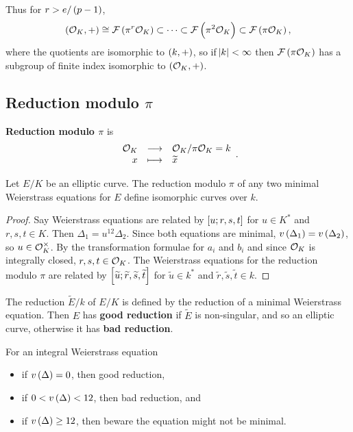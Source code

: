 Thus for $ r > e / \br{p - 1} $,
$$ \br{\OOO_K, +} \cong \FFF\br{\pi^r\OOO_K} \subset \dots \subset \FFF\br{\pi^2\OOO_K} \subset \FFF\br{\pi\OOO_K}, $$
where the quotients are isomorphic to $ \br{k, +} $, so if $ \abs{k} < \infty $ then $ \FFF\br{\pi\OOO_K} $ has a subgroup of finite index isomorphic to $ \br{\OOO_K, +} $.

\subsection{Reduction modulo \texorpdfstring{$ \pi $}{p}}

\begin{notation*}
\textbf{Reduction modulo $ \pi $} is
$$ \function{\OOO_K}{\OOO_K / \pi\OOO_K = k}{x}{\widetilde{x}}. $$
\end{notation*}

\begin{proposition}
Let $ E / K $ be an elliptic curve. The reduction modulo $ \pi $ of any two minimal Weierstrass equations for $ E $ define isomorphic curves over $ k $.
\end{proposition}

\begin{proof}
Say Weierstrass equations are related by $ \sbr{u; r, s, t} $ for $ u \in K^* $ and $ r, s, t \in K $. Then $ \Delta_1 = u^{12}\Delta_2 $. Since both equations are minimal, $ v\br{\Delta_1} = v\br{\Delta_2} $, so $ u \in \mathcal{O}_K^\times $. By the transformation formulae for $ a_i $ and $ b_i $ and since $ \mathcal{O}_K $ is integrally closed, $ r, s, t \in \mathcal{O}_K $. The Weierstrass equations for the reduction modulo $ \pi $ are related by $ \sbr{\widetilde{u}; \widetilde{r}, \widetilde{s}, \widetilde{t}} $ for $ \widetilde{u} \in k^* $ and $ \widetilde{r}, \widetilde{s}, \widetilde{t} \in k $.
\end{proof}

\begin{definition*}
The reduction $ \widetilde{E} / k $ of $ E / K $ is defined by the reduction of a minimal Weierstrass equation. Then $ E $ has \textbf{good reduction} if $ \widetilde{E} $ is non-singular, and so an elliptic curve, otherwise it has \textbf{bad reduction}.
\end{definition*}

For an integral Weierstrass equation
\begin{itemize}
\item if $ v\br{\Delta} = 0 $, then good reduction,
\item if $ 0 < v\br{\Delta} < 12 $, then bad reduction, and
\item if $ v\br{\Delta} \ge 12 $, then beware the equation might not be minimal.
\end{itemize}


